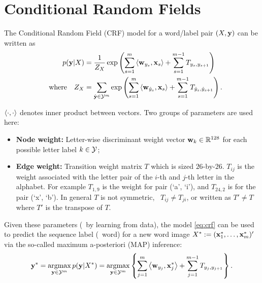\documentclass[11pt]{report}
\begin{document}
\maketitle

\section{Conditional Random Fields}
The Conditional Random Field (CRF) model for a word/label pair $(X, \mathbf{\boldsymbol{y}})$ can be written as
\begin{align}
	\label{eq:crf}
	p(\mathbf{\boldsymbol{y}} | X ) &= \frac{1}{Z_X} \exp \left(\sum_{s=1}^m \left\langle \mathbf{\boldsymbol{w}}_{y_s},\mathbf{\boldsymbol{x}}_s \right\rangle + \sum_{s=1}^{m-1} T_{y_s, y_{s+1}}\right) \\
	{\quad \text{where} \quad} Z_X &= \sum_{\hat{\mathbf{\boldsymbol{y}}} \in \mathcal{Y}^m} \exp \left(\sum_{s=1}^m \left\langle \mathbf{\boldsymbol{w}}_{\hat{y}_s},\mathbf{\boldsymbol{x}}_s \right\rangle + \sum_{s=1}^{m-1} T_{\hat{y}_s, \hat{y}_{s+1}}\right).
\end{align}

$\left\langle \cdot,\cdot \right\rangle$ denotes inner product between vectors.
Two groups of parameters are used here:

\vspace{-1em}
\begin{itemize}
	\item {\bf Node weight:} Letter-wise discriminant weight vector $\mathbf{\boldsymbol{w}}_k \in \mathbb{R}^{128}$ for each possible letter label $k \in \mathcal{Y}$;
	\item {\bf Edge weight:} Transition weight matrix $T$ which is sized $26$-by-$26$.
	$T_{ij}$ is the weight associated with the letter pair of the $i$-th and $j$-th letter in the alphabet.  For example $T_{1,9}$ is the weight for pair (`a', `i'), and $T_{24,2}$ is for the pair (`x', `b'). In general $T$ is not symmetric, \ie\ $T_{ij} \neq T_{ji}$, or written as $T' \neq T$ where $T'$ is the transpose of $T$.
\end{itemize}

Given these parameters (\eg\ by learning from data), the model \eqref{eq:crf} can be used to predict the sequence label (\ie\ word) for a new word image $X^* := (\mathbf{\boldsymbol{x}}^*_1, \ldots, \mathbf{\boldsymbol{x}}^*_m)'$ via the so-called maximum a-posteriori (MAP) inference:
\begin{align}
	\label{eq:crf_decode}
	\mathbf{\boldsymbol{y}}^* = \operatorname*{\mathrm{argmax}}_{\mathbf{\boldsymbol{y}} \in \mathcal{Y}^m} p(\mathbf{\boldsymbol{y}} | X^*)
	= \operatorname*{\mathrm{argmax}}_{\mathbf{\boldsymbol{y}} \in \mathcal{Y}^m} \left\{ \sum_{j=1}^m \left\langle \mathbf{\boldsymbol{w}}_{y_j},\mathbf{\boldsymbol{x}}^*_j \right\rangle + \sum_{j=1}^{m-1} T_{y_j, y_{j+1}}\right\}.
\end{align}
\end{document}
